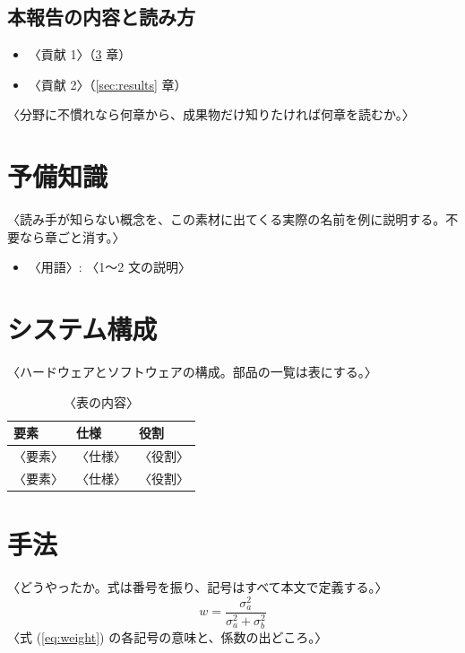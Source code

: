 \documentclass[xelatex,ja=standard,a4paper,twocolumn,10pt]{bxjsarticle}
\begin{document}
\subsection{本報告の内容と読み方}
\begin{itemize}
\item 〈貢献 1〉（\ref{sec:method} 章）
\item 〈貢献 2〉（\ref{sec:results} 章）
\end{itemize}
〈分野に不慣れなら何章から、成果物だけ知りたければ何章を読むか。〉

\section{予備知識}\label{sec:prelim}
〈読み手が知らない概念を、この素材に出てくる実際の名前を例に説明する。不要なら章ごと消す。〉
\begin{itemize}
\item 〈用語〉: 〈1〜2 文の説明〉
\end{itemize}

\section{システム構成}\label{sec:system}
〈ハードウェアとソフトウェアの構成。部品の一覧は表にする。〉

\begin{table}[tb]
\caption{〈表の内容〉}\label{tab:parts}
\footnotesize\sffamily
\begin{tabularx}{\columnwidth}{@{}l Y Y@{}}
\toprule
要素 & 仕様 & 役割 \\
\midrule
〈要素〉 & 〈仕様〉 & 〈役割〉 \\
〈要素〉 & 〈仕様〉 & 〈役割〉 \\
\bottomrule
\end{tabularx}
\end{table}

\section{手法}\label{sec:method}
〈どうやったか。式は番号を振り、記号はすべて本文で定義する。〉
\begin{equation}
w = \frac{\sigma_a^2}{\sigma_a^2 + \sigma_b^2}
\label{eq:weight}
\end{equation}
〈式 (\ref{eq:weight}) の各記号の意味と、係数の出どころ。〉
\end{document}
